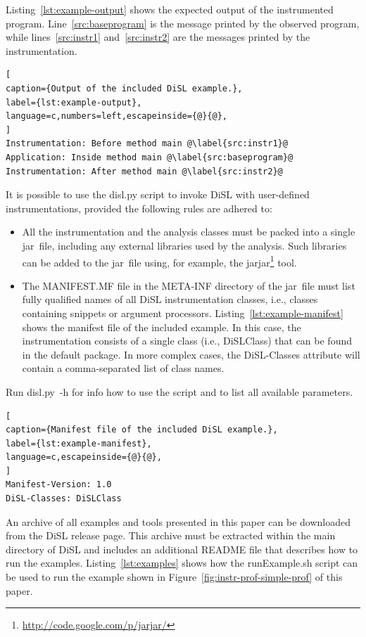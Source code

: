 \documentclass{article}
\newcommand{\brcode}[1]{\textsf{#1}}
\newcommand{\code}[1]{\mbox{\brcode{#1}}}
\begin{document}
\medskip
Listing~\ref{lst:example-output} shows the expected output of the instrumented program.
Line~\ref{src:baseprogram} is the message printed by the observed program, while lines~\ref{src:instr1} and~\ref{src:instr2} are the messages printed by the instrumentation.

\begin{lstlisting}[
caption={Output of the included DiSL example.},
label={lst:example-output},
language=c,numbers=left,escapeinside={@}{@},
]
Instrumentation: Before method main @\label{src:instr1}@
Application: Inside method main @\label{src:baseprogram}@
Instrumentation: After method main @\label{src:instr2}@
\end{lstlisting}


\medskip
It is possible to use the \code{disl.py} script to invoke DiSL with user-defined instrumentations, provided the following rules are adhered to:
\begin{itemize}
\item All the instrumentation and the analysis classes must be packed into a single jar~file, including any external libraries used by the analysis.
Such libraries can be added to the jar~file using, for example, the \code{jarjar}\footnote{\url{http://code.google.com/p/jarjar/}} tool.

\item The \code{MANIFEST.MF} file in the \code{META-INF} directory of the jar~file must list fully qualified names of all DiSL instrumentation classes, i.e., classes containing snippets or argument processors.
Listing~\ref{lst:example-manifest} shows the manifest file of the included example.
In this case, the instrumentation consists of a single class (i.e., \code{DiSLClass}) that can be found in the default package.
In more complex cases, the \code{DiSL-Classes} attribute will contain a comma-separated list of class names.
\end{itemize}

Run \code{disl.py -h} for info how to use the script and to list all available parameters.

\begin{lstlisting}[
caption={Manifest file of the included DiSL example.},
label={lst:example-manifest},
language=c,escapeinside={@}{@},
]
Manifest-Version: 1.0
DiSL-Classes: DiSLClass
\end{lstlisting}


\medskip
An archive of all examples and tools presented in this paper can be downloaded from the DiSL release page.
This archive must be extracted within the main directory of DiSL and includes an additional \code{README} file that describes how to run the examples.
Listing~\ref{lst:examples} shows how the \code{runExample.sh} script can be used to run the example shown in Figure~\ref{fig:instr-prof-simple-prof} of this paper.
\end{document}
